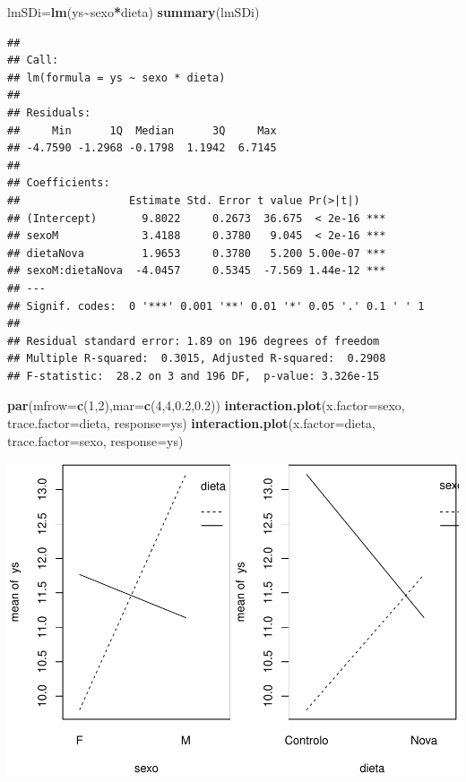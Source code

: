 \documentclass[
]{book}
\newenvironment{Shaded}{\begin{snugshade}}{\end{snugshade}}
\newcommand{\AttributeTok}[1]{\textcolor[rgb]{0.13,0.29,0.53}{#1}}
\newcommand{\DecValTok}[1]{\textcolor[rgb]{0.00,0.00,0.81}{#1}}
\newcommand{\FloatTok}[1]{\textcolor[rgb]{0.00,0.00,0.81}{#1}}
\newcommand{\FunctionTok}[1]{\textcolor[rgb]{0.13,0.29,0.53}{\textbf{#1}}}
\newcommand{\NormalTok}[1]{#1}
\newcommand{\OtherTok}[1]{\textcolor[rgb]{0.56,0.35,0.01}{#1}}
\newcommand{\SpecialCharTok}[1]{\textcolor[rgb]{0.81,0.36,0.00}{\textbf{#1}}}
\begin{document}
\begin{Shaded}
\begin{Highlighting}[]
\NormalTok{lmSDi}\OtherTok{=}\FunctionTok{lm}\NormalTok{(ys}\SpecialCharTok{\textasciitilde{}}\NormalTok{sexo}\SpecialCharTok{*}\NormalTok{dieta)}
\FunctionTok{summary}\NormalTok{(lmSDi)}
\end{Highlighting}
\end{Shaded}

\begin{verbatim}
## 
## Call:
## lm(formula = ys ~ sexo * dieta)
## 
## Residuals:
##     Min      1Q  Median      3Q     Max 
## -4.7590 -1.2968 -0.1798  1.1942  6.7145 
## 
## Coefficients:
##                 Estimate Std. Error t value Pr(>|t|)    
## (Intercept)       9.8022     0.2673  36.675  < 2e-16 ***
## sexoM             3.4188     0.3780   9.045  < 2e-16 ***
## dietaNova         1.9653     0.3780   5.200 5.00e-07 ***
## sexoM:dietaNova  -4.0457     0.5345  -7.569 1.44e-12 ***
## ---
## Signif. codes:  0 '***' 0.001 '**' 0.01 '*' 0.05 '.' 0.1 ' ' 1
## 
## Residual standard error: 1.89 on 196 degrees of freedom
## Multiple R-squared:  0.3015, Adjusted R-squared:  0.2908 
## F-statistic:  28.2 on 3 and 196 DF,  p-value: 3.326e-15
\end{verbatim}

\begin{Shaded}
\begin{Highlighting}[]
\FunctionTok{par}\NormalTok{(}\AttributeTok{mfrow=}\FunctionTok{c}\NormalTok{(}\DecValTok{1}\NormalTok{,}\DecValTok{2}\NormalTok{),}\AttributeTok{mar=}\FunctionTok{c}\NormalTok{(}\DecValTok{4}\NormalTok{,}\DecValTok{4}\NormalTok{,}\FloatTok{0.2}\NormalTok{,}\FloatTok{0.2}\NormalTok{))}
\FunctionTok{interaction.plot}\NormalTok{(}\AttributeTok{x.factor=}\NormalTok{sexo, }\AttributeTok{trace.factor=}\NormalTok{dieta, }\AttributeTok{response=}\NormalTok{ys)}
\FunctionTok{interaction.plot}\NormalTok{(}\AttributeTok{x.factor=}\NormalTok{dieta, }\AttributeTok{trace.factor=}\NormalTok{sexo, }\AttributeTok{response=}\NormalTok{ys)}
\end{Highlighting}
\end{Shaded}

\includegraphics{ECOMODbook_files/figure-latex/a11.1-2.pdf}
\end{document}
